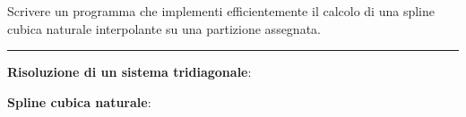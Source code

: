 Scrivere un programma che implementi efficientemente il calcolo di una spline cubica naturale interpolante su una partizione assegnata.

\hspace*{\fill}
\par\noindent\rule{\textwidth}{0.4pt}
\hspace*{\fill}

\begin{minipage}{\textwidth}
    \textbf{Risoluzione di un sistema tridiagonale}:
    
\end{minipage}

\begin{minipage}{\textwidth}
    \textbf{Spline cubica naturale}:
    
\end{minipage}
